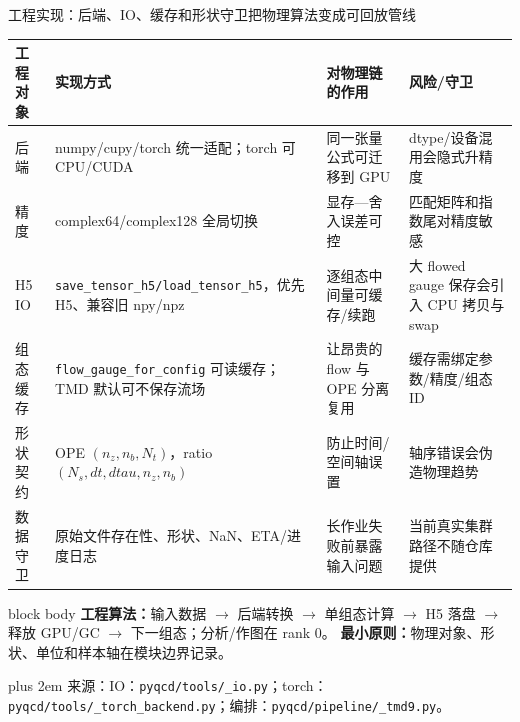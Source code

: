 \documentclass[UTF8,aspectratio=169,11pt]{ctexbeamer}
\renewcommand{\arraystretch}{0.92}
\newcommand{\source}[1]{%
  \par\vspace{0.02em}\begingroup\fontsize{6}{6.8}\selectfont\raggedright\sloppy
  \setlength{\emergencystretch}{3em}\rightskip=0pt plus 2em
  \color{muted}来源：#1\par\endgroup}
\begin{document}
\begin{frame}[t]{工程实现：后端、IO、缓存和形状守卫把物理算法变成可回放管线}
  \footnotesize
  \renewcommand{\arraystretch}{0.82}
  \begin{tabularx}{0.98\textwidth}{@{}p{}Yp{0.22\textwidth}Y@{}}
    \toprule
    工程对象 & 实现方式 & 对物理链的作用 & 风险/守卫\\
    \midrule
    后端 & numpy/cupy/torch 统一适配；torch 可 CPU/CUDA & 同一张量公式可迁移到 GPU & dtype/设备混用会隐式升精度\\
    精度 & complex64/complex128 全局切换 & 显存—舍入误差可控 & 匹配矩阵和指数尾对精度敏感\\
    H5 IO & \nolinkurl{save_tensor_h5/load_tensor_h5}，优先 H5、兼容旧 npy/npz & 逐组态中间量可缓存/续跑 & 大 flowed gauge 保存会引入 CPU 拷贝与 swap\\
    组态缓存 & \nolinkurl{flow_gauge_for_config} 可读缓存；TMD 默认可不保存流场 & 让昂贵的 flow 与 OPE 分离复用 & 缓存需绑定参数/精度/组态 ID\\
    形状契约 & OPE \((n_z,n_b,N_t)\)，ratio \((N_s,dt,dtau,n_z,n_b)\) & 防止时间/空间轴误置 & 轴序错误会伪造物理趋势\\
    数据守卫 & 原始文件存在性、形状、NaN、ETA/进度日志 & 长作业失败前暴露输入问题 & 当前真实集群路径不随仓库提供\\
    \bottomrule
  \end{tabularx}
  \vspace{0.1em}
  \begin{beamercolorbox}[wd=0.98\textwidth,sep=0.18em,rounded=true]{block body}
    \scriptsize
    \textbf{工程算法：}输入数据 \(\to\) 后端转换 \(\to\) 单组态计算 \(\to\) H5 落盘
    \(\to\) 释放 GPU/GC \(\to\) 下一组态；分析/作图在 rank 0。
    \quad \textbf{最小原则：}物理对象、形状、单位和样本轴在模块边界记录。
  \end{beamercolorbox}
  \source{IO：\nolinkurl{pyqcd/tools/_io.py}；torch：\nolinkurl{pyqcd/tools/_torch_backend.py}；编排：\nolinkurl{pyqcd/pipeline/_tmd9.py}。}
\end{frame}
\end{document}
